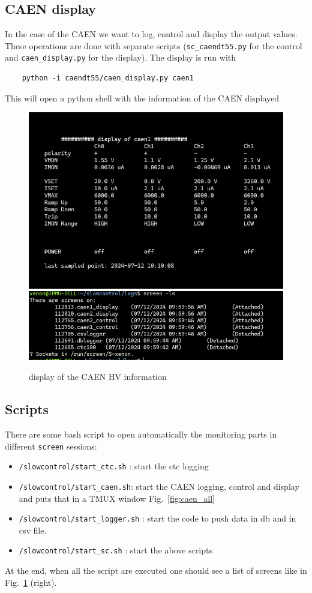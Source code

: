 \documentclass{article}
\begin{document}
\subsection{CAEN display}
In the case of the CAEN we want to log, control and display the output values. These operations are done with separate scripts (\verb|sc_caendt55.py| for the control and \verb|caen_display.py| for the display). The display is run with 
\begin{verbatim}
    python -i caendt55/caen_display.py caen1
\end{verbatim}
This will open a python shell with the information of the CAEN displayed  
\begin{figure}
\centering
\includegraphics[width=0.45\linewidth]{caen_display.png}
    \includegraphics[width=0.45\linewidth]{image.png}
\caption{\label{fig:caen_display}display of the CAEN HV information}
\end{figure}

\subsection{Scripts}
There are some bash script to open automatically the monitoring parts in different \verb|screen| sessions:
\begin{itemize}
    \item \verb|/slowcontrol/start_ctc.sh| : start the ctc logging    
    \item \verb|/slowcontrol/start_caen.sh|: start the CAEN logging, control and display and puts that in a TMUX window Fig.~\ref{fig:caen_all}
    \item \verb|/slowcontrol/start_logger.sh| : start the code to push data in db and in csv file.
    \item \verb|/slowcontrol/start_sc.sh| : start the above scripts
\end{itemize}
At the end, when all the script are executed one should see a list of screens like in Fig.~\ref{fig:caen_display} (right).
\end{document}
